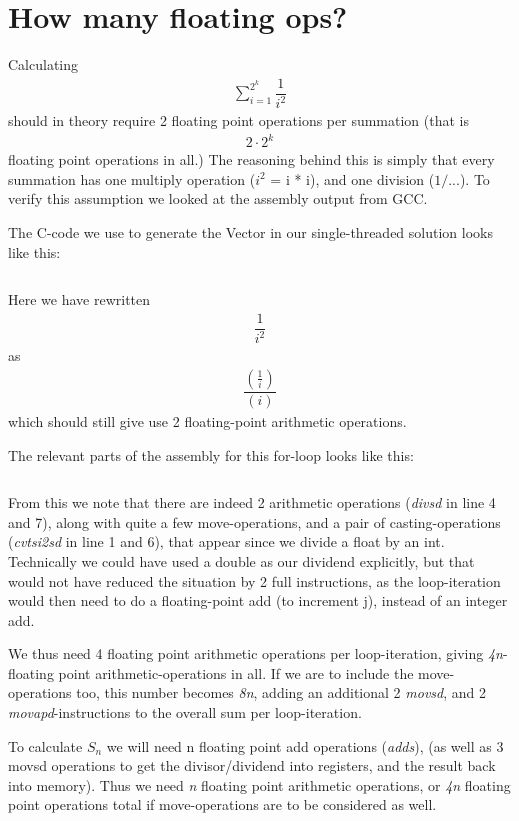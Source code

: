\section{How many floating ops?}

Calculating \begin{align*}\sum_{i=1}^{2^k}\dfrac{1}{i^2}\end{align*} should in theory require 2 floating
point operations per summation (that is 
\begin{align*}2\cdot 2^k
\end{align*} 
floating point operations in all.)
The reasoning behind this is simply that every summation has one multiply operation ($i^2$ = i * i), and one division
($1/...$). To verify this assumption we looked at the assembly output from GCC.

The C-code we use to generate the Vector in our single-threaded solution
looks like this:
\inputminted[tabsize=4]{c}{CreateVector.c}

Here we have rewritten 
\begin{align*}
\dfrac{1}{i^2}
\end{align*} 
as 
\begin{align*}
\dfrac{\left(\frac{1}{i}\right)}{(i)}
\end{align*}
which
should still give use 2 floating-point arithmetic operations.

The relevant parts of the assembly for this for-loop looks like this:

\inputminted[linenos]{gas}{SingleThread.s}

From this we note that there are indeed 2 arithmetic operations (\emph{divsd} in line 4 and 7), along with quite a few move-operations,
and a pair of casting-operations (\emph{cvtsi2sd} in line 1 and 6), that appear since we divide a float by an int. Technically we could
have used a double as our dividend explicitly, but that would not have reduced the situation by 2 full instructions,
as the loop-iteration would then need to do a floating-point add (to increment j), instead of an integer add.

We thus need 4 floating point arithmetic operations per loop-iteration, giving \emph{4n}-floating point arithmetic-operations in all. If we are to include the move-operations too, this number becomes \emph{8n}, adding an additional 2 \emph{movsd},
and 2 \emph{movapd}-instructions to the overall sum per loop-iteration.

To calculate $S_n$ we will need n floating point add operations (\emph{adds}), (as well as 3 movsd operations to get the divisor/dividend
into registers, and the result back into memory). Thus we need \emph{n} floating point arithmetic operations, or \emph{4n} floating point
operations total if move-operations are to be considered as well.


